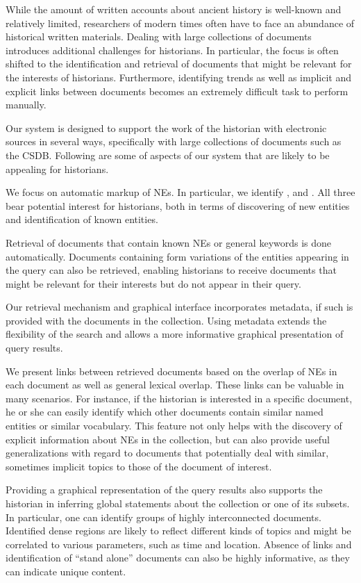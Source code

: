 While the amount of written accounts about ancient history is well-known and relatively limited, researchers of modern times often have to 
face an abundance of historical written materials. Dealing with large collections of documents introduces additional challenges for historians. 
In particular, the focus is often shifted to the identification and retrieval of documents that might be relevant for the interests of 
historians. Furthermore, identifying trends as well as implicit and explicit links between documents becomes an extremely difficult task to 
perform manually.

Our system is designed to support the work of the historian with electronic sources in several ways, specifically with large collections of documents such as the CSDB. Following are some of aspects of our system that are likely to be appealing for historians.

We focus on automatic markup of NEs. In particular, we identify ,  and . All three bear potential 
interest for historians, both in terms of discovering of new entities and identification of known entities. 

Retrieval of documents that contain known NEs or general keywords is done automatically. Documents containing form variations of 
the entities appearing in the query can also be retrieved, enabling historians to receive documents that might be relevant for their interests 
but do not appear in their query.

Our retrieval mechanism and graphical interface incorporates metadata, if such is provided with the documents in the collection. 
Using metadata extends the flexibility of the search and allows a more informative graphical presentation of query results.

We present links between retrieved documents based on the overlap of NEs in each document as well as general lexical overlap. These links can be valuable in many scenarios. 
For instance, if the historian is interested in a specific document, he or she can easily identify which other documents contain similar named 
entities or similar vocabulary. This feature not only helps with the discovery of explicit information about NEs in the 
collection, but can also provide useful generalizations with regard to documents that potentially deal with similar, sometimes implicit 
topics to those of the document of interest.   

Providing a graphical representation of the query results also supports the historian in inferring global statements about the collection or 
one of its subsets. In particular, one can identify groups of highly interconnected documents. Identified dense regions are likely to reflect 
different kinds of topics and might be correlated to various parameters, such as time and location. Absence of links and identification of 
``stand alone'' documents can also be highly informative, as they can indicate unique content. 

